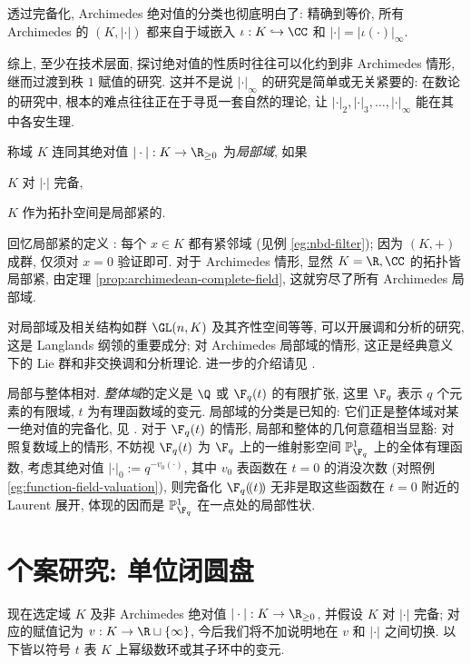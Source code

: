 透过完备化, Archimedes 绝对值的分类也彻底明白了: 精确到等价, 所有 Archimedes 的 $(K, |\cdot|)$ 都来自于域嵌入 $\iota: K \hookrightarrow \CC$ 和 $|\cdot| = |\iota(\cdot)|_\infty$.

综上, 至少在技术层面, 探讨绝对值的性质时往往可以化约到非 Archimedes 情形, 继而过渡到秩 $1$ 赋值的研究. 这并不是说 $|\cdot|_\infty$ 的研究是简单或无关紧要的: 在数论的研究中, 根本的难点往往正在于寻觅一套自然的理论, 让 $|\cdot|_2, |\cdot|_3, \ldots, |\cdot|_\infty$ 能在其中各安生理.

\begin{definition}
	称域 $K$ 连同其绝对值 $|\cdot|: K \to \R_{\geq 0}$ 为\emph{局部域}, 如果
	\begin{inparaenum}[(a)]
		\item $K$ 对 $|\cdot|$ 完备,
		\item $K$ 作为拓扑空间是局部紧的.
	\end{inparaenum}
\end{definition}
回忆局部紧的定义 \cite[\S 7.6]{Xiong}: 每个 $x \in K$ 都有紧邻域 (见例 \ref{eg:nbd-filter}); 因为 $(K,+)$ 成群, 仅须对 $x=0$ 验证即可. 对于 Archimedes 情形, 显然 $K=\R, \CC$ 的拓扑皆局部紧, 由定理 \ref{prop:archimedean-complete-field}, 这就穷尽了所有 Archimedes 局部域.

对局部域及相关结构如群 $\GL(n,K)$ 及其齐性空间等等, 可以开展调和分析的研究, 这是 Langlands 纲领的重要成分; 对 Archimedes 局部域的情形, 这正是经典意义下的 Lie 群和非交换调和分析理论. 进一步的介绍请见 \cite{FL14}.

局部与整体相对. \emph{整体域}的定义是 $\Q$ 或 $\F_q(t)$ 的有限扩张, 这里 $\F_q$ 表示 $q$ 个元素的有限域, $t$ 为有理函数域的变元. 局部域的分类是已知的: 它们正是整体域对某一绝对值的完备化, 见 \cite[II. (5.2)]{Neu99}. 对于 $\F_q(t)$ 的情形, 局部和整体的几何意蕴相当显豁: 对照复数域上的情形, 不妨视 $\F_q(t)$ 为 $\F_q$ 上的一维射影空间 $\mathbb{P}^1_{\F_q}$ 上的全体有理函数, 考虑其绝对值 $|\cdot|_0 := q^{-v_0(\cdot)}$, 其中 $v_0$ 表函数在 $t=0$ 的消没次数 (对照例 \ref{eg:function-field-valuation}), 则完备化 $\F_q(\!(t)\!)$ 无非是取这些函数在 $t=0$ 附近的 Laurent 展开, 体现的因而是 $\mathbb{P}^1_{\F_q}$ 在一点处的局部性状. 

\section{个案研究: 单位闭圆盘}\label{sec:closed-unit-disc}
现在选定域 $K$ 及非 Archimedes 绝对值 $|\cdot|: K \to \R_{\geq 0}$, 并假设 $K$ 对 $|\cdot|$ 完备; 对应的赋值记为 $v: K \to \R \sqcup \{\infty\}$, 今后我们将不加说明地在 $v$ 和 $|\cdot|$ 之间切换. 以下皆以符号 $t$ 表 $K$ 上幂级数环或其子环中的变元.


